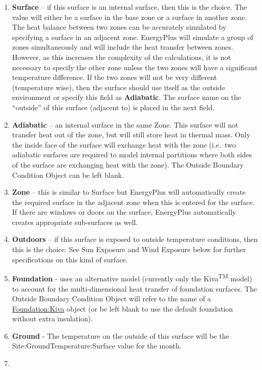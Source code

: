 \begin{enumerate}
  \item
    \textbf{Surface} -- if this surface is an internal surface, then this is the choice. The value will either be a surface in the base zone or a surface in another zone. The heat balance between two zones can be accurately simulated by specifying a surface in an adjacent zone. EnergyPlus will simulate a group of zones simultaneously and will include the heat transfer between zones. However, as this increases the complexity of the calculations, it is not necessary to specify the other zone unless the two zones will have a significant temperature difference. If the two zones will not be very different (temperature wise), then the surface should use itself as the outside environment or specify this field as \textbf{Adiabatic}. The surface name on the ``outside'' of this surface (adjacent to) is placed in the next field.
  \item
    \textbf{Adiabatic} -- an internal surface in the same Zone. This surface will not transfer heat out of the zone, but will still store heat in thermal mass. Only the inside face of the surface will exchange heat with the zone (i.e.~two adiabatic surfaces are required to model internal partitions where both sides of the surface are exchanging heat with the zone). The Outside Boundary Condition Object can be left blank.
  \item
    \textbf{Zone} -- this is similar to Surface but EnergyPlus will automatically create the required surface in the adjacent zone when this is entered for the surface. If there are windows or doors on the surface, EnergyPlus automatically creates appropriate sub-surfaces as well.
  \item
    \textbf{Outdoors} -- if this surface is exposed to outside temperature conditions, then this is the choice. See Sun Exposure and Wind Exposure below for further specifications on this kind of surface.
  \item
    \textbf{Foundation} - uses an alternative model (currently only the Kiva\textsuperscript{TM} model) to account for the multi-dimensional heat transfer of foundation surfaces. The Outside Boundary Condition Object will refer to the name of a \hyperref[foundationkiva]{Foundation:Kiva} object (or be left blank to use the default foundation without extra insulation).
  \item
    \textbf{Ground} - The temperature on the outside of this surface will be the Site:GroundTemperature:Surface value for the month.
  \item

\end{enumerate}
